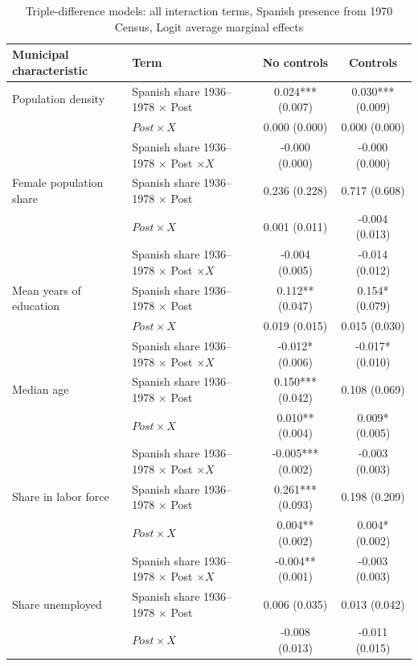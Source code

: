 \begin{table}[!htbp]
\small
\renewcommand{\arraystretch}{1}
\setlength{\tabcolsep}{3pt}
\centering
\caption{Triple-difference models: all interaction terms, Spanish presence from 1970 Census, Logit average marginal effects}
\label{tab:triple_pooled_all_c70_ame_stata}
\captionsetup{justification=centering}
\begin{tabular}{llcc}
\hline
Municipal characteristic & Term & No controls & Controls \\
\hline
Population density & Spanish share 1936--1978 \(\times\) Post & 0.024*** (0.007) & 0.030*** (0.009) \\
 & \(Post \times X\) & 0.000 (0.000) & 0.000 (0.000) \\
 & Spanish share 1936--1978 \(\times\) Post \(\times X\) & -0.000 (0.000) & -0.000 (0.000) \\
\addlinespace
Female population share & Spanish share 1936--1978 \(\times\) Post & 0.236 (0.228) & 0.717 (0.608) \\
 & \(Post \times X\) & 0.001 (0.011) & -0.004 (0.013) \\
 & Spanish share 1936--1978 \(\times\) Post \(\times X\) & -0.004 (0.005) & -0.014 (0.012) \\
\addlinespace
Mean years of education & Spanish share 1936--1978 \(\times\) Post & 0.112** (0.047) & 0.154* (0.079) \\
 & \(Post \times X\) & 0.019 (0.015) & 0.015 (0.030) \\
 & Spanish share 1936--1978 \(\times\) Post \(\times X\) & -0.012* (0.006) & -0.017* (0.010) \\
\addlinespace
Median age & Spanish share 1936--1978 \(\times\) Post & 0.150*** (0.042) & 0.108 (0.069) \\
 & \(Post \times X\) & 0.010** (0.004) & 0.009* (0.005) \\
 & Spanish share 1936--1978 \(\times\) Post \(\times X\) & -0.005*** (0.002) & -0.003 (0.003) \\
\addlinespace
Share in labor force & Spanish share 1936--1978 \(\times\) Post & 0.261*** (0.093) & 0.198 (0.209) \\
 & \(Post \times X\) & 0.004** (0.002) & 0.004* (0.002) \\
 & Spanish share 1936--1978 \(\times\) Post \(\times X\) & -0.004** (0.001) & -0.003 (0.003) \\
\addlinespace
Share unemployed & Spanish share 1936--1978 \(\times\) Post & 0.006 (0.035) & 0.013 (0.042) \\
 & \(Post \times X\) & -0.008 (0.013) & -0.011 (0.015) \\

\end{tabular}
\end{table}
